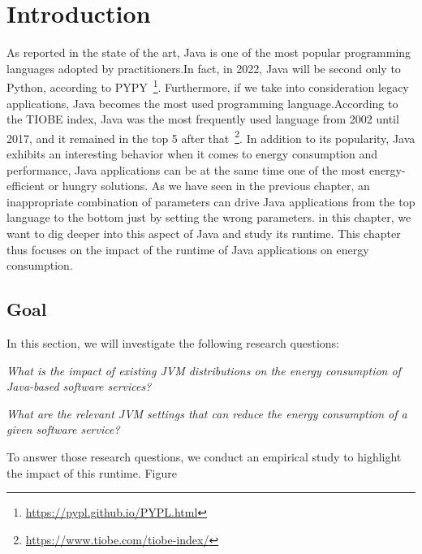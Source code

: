 \section{Introduction}
As reported in the state of the art, Java is one of the most popular programming languages adopted by practitioners.In fact, in 2022, Java will be second only to Python, according to PYPY~\footnote{\url{https://pypl.github.io/PYPL.html}}.
Furthermore, if we take into consideration legacy applications, Java becomes the most used programming language.According to the TIOBE index, Java was the most frequently used language from 2002 until 2017, and it remained in the top 5 after that~\footnote{\url{https://www.tiobe.com/tiobe-index/}}.
In addition to its popularity, Java exhibits an interesting behavior when it comes to energy consumption and performance, Java applications can be at the same time one of the most energy-efficient or hungry solutions.
As we have seen in the previous chapter, an inappropriate combination of parameters can drive Java applications from the top language to the bottom just by setting the wrong parameters.
in this chapter, we want to dig deeper into this aspect of Java and study its runtime.
This chapter thus focuses on the impact of the runtime of Java applications on energy consumption.

\subsection{Goal}
In this section, we will investigate the following research questions:
\begin{compactenum}[\indent\bf RQ\,1:]
    \item \emph{What is the impact of existing JVM distributions on the energy consumption of Java-based software services?}
    \item \emph{What are the relevant JVM settings that can reduce the energy consumption of a given software service?}
\end{compactenum}

To answer those research questions, we conduct an empirical study to highlight the impact of this runtime.
Figure


